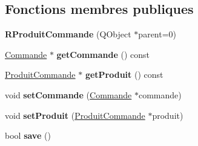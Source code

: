 \subsection*{Fonctions membres publiques}
\begin{DoxyCompactItemize}
\item 
\hypertarget{class_core_1_1_r_produit_commande_a2e9cd2c0387b6afffa295ae84b2e8c26}{
{\bfseries RProduitCommande} (QObject $\ast$parent=0)}
\label{d3/dad/class_core_1_1_r_produit_commande_a2e9cd2c0387b6afffa295ae84b2e8c26}

\item 
\hypertarget{class_core_1_1_r_produit_commande_ae158ca7581b66a19754333f503a84186}{
\hyperlink{class_core_1_1_commande}{Commande} $\ast$ {\bfseries getCommande} () const }
\label{d3/dad/class_core_1_1_r_produit_commande_ae158ca7581b66a19754333f503a84186}

\item 
\hypertarget{class_core_1_1_r_produit_commande_a16358dc859df69c57ee839baf5a5e649}{
\hyperlink{class_core_1_1_produit_commande}{ProduitCommande} $\ast$ {\bfseries getProduit} () const }
\label{d3/dad/class_core_1_1_r_produit_commande_a16358dc859df69c57ee839baf5a5e649}

\item 
\hypertarget{class_core_1_1_r_produit_commande_a0dff00840852b994f29929bf3731812e}{
void {\bfseries setCommande} (\hyperlink{class_core_1_1_commande}{Commande} $\ast$commande)}
\label{d3/dad/class_core_1_1_r_produit_commande_a0dff00840852b994f29929bf3731812e}

\item 
\hypertarget{class_core_1_1_r_produit_commande_af2ee8a58992da03e17d2a6864d620519}{
void {\bfseries setProduit} (\hyperlink{class_core_1_1_produit_commande}{ProduitCommande} $\ast$produit)}
\label{d3/dad/class_core_1_1_r_produit_commande_af2ee8a58992da03e17d2a6864d620519}

\item 
\hypertarget{class_core_1_1_r_produit_commande_a5ea11f38293ac9d03019368f808c19c3}{
bool {\bfseries save} ()}
\label{d3/dad/class_core_1_1_r_produit_commande_a5ea11f38293ac9d03019368f808c19c3}

\end{DoxyCompactItemize}
